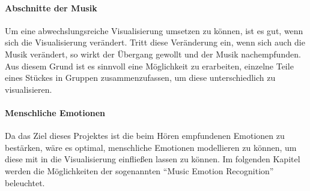 \documentclass[11pt,a4paper]{article}
\begin{document}
\paragraph{Abschnitte der Musik}
Um eine abwechslungsreiche Visualisierung umsetzen zu können, ist es gut, wenn sich die Visualisierung verändert. Tritt diese Veränderung ein, wenn sich auch die Musik verändert, so wirkt der Übergang gewollt und der Musik nachempfunden. Aus diesem Grund ist es sinnvoll eine Möglichkeit zu erarbeiten, einzelne Teile eines Stückes in Gruppen zusammenzufassen, um diese unterschiedlich zu visualisieren.

\paragraph{Menschliche Emotionen}
Da das Ziel dieses Projektes ist die beim Hören empfundenen Emotionen zu bestärken, wäre es optimal, menschliche Emotionen modellieren zu können, um diese mit in die Visualisierung einfließen lassen zu können. Im folgenden Kapitel werden die Möglichkeiten der sogenannten ``Music Emotion Recognition'' beleuchtet.
\end{document}
